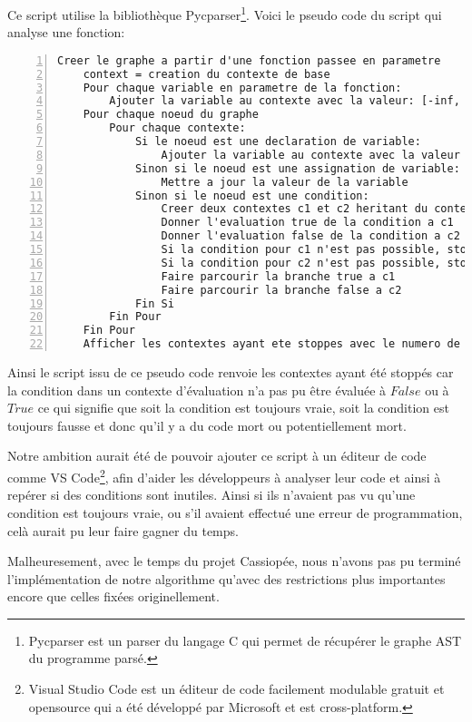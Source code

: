 Ce script utilise la bibliothèque Pycparser\footnote{Pycparser est un parser du langage C qui permet de récupérer le graphe AST du programme parsé.}.
\newpage
Voici le pseudo code du script qui analyse une fonction:
\begin{lstlisting}[numbers=left, caption={Pseudo code du script de détection d'incohérence}, captionpos=b]
    Creer le graphe a partir d'une fonction passee en parametre
    context = creation du contexte de base
    Pour chaque variable en parametre de la fonction:
        Ajouter la variable au contexte avec la valeur: [-inf, inf]
    Pour chaque noeud du graphe
        Pour chaque contexte:
            Si le noeud est une declaration de variable:
                Ajouter la variable au contexte avec la valeur d'initialisation
            Sinon si le noeud est une assignation de variable:
                Mettre a jour la valeur de la variable
            Sinon si le noeud est une condition:
                Creer deux contextes c1 et c2 heritant du contexte actuel
                Donner l'evaluation true de la condition a c1
                Donner l'evaluation false de la condition a c2
                Si la condition pour c1 n'est pas possible, stopper c1
                Si la condition pour c2 n'est pas possible, stopper c2
                Faire parcourir la branche true a c1
                Faire parcourir la branche false a c2
            Fin Si
        Fin Pour
    Fin Pour
    Afficher les contextes ayant ete stoppes avec le numero de ligne en cause
\end{lstlisting}

Ainsi le script issu de ce pseudo code renvoie les contextes ayant été stoppés car la condition dans un contexte d'évaluation n'a pas pu être évaluée à $False$ ou à $True$ ce qui signifie que soit la condition est toujours vraie, soit la condition est toujours fausse et donc qu'il y a du code mort ou potentiellement mort.

Notre ambition aurait été de pouvoir ajouter ce script à un éditeur de code comme VS Code\footnote{Visual Studio Code est un éditeur de code facilement modulable gratuit et opensource qui a été développé par Microsoft et est cross-platform.}, afin d'aider les développeurs à analyser leur code et ainsi à repérer si des conditions sont inutiles. Ainsi si ils n'avaient pas vu qu'une condition est toujours vraie, ou s'il avaient effectué une erreur de programmation, celà aurait pu leur faire gagner du temps.

Malheuresement, avec le temps du projet Cassiopée, nous n'avons pas pu terminé l'implémentation de notre algorithme qu'avec des restrictions plus importantes encore que celles fixées originellement.

